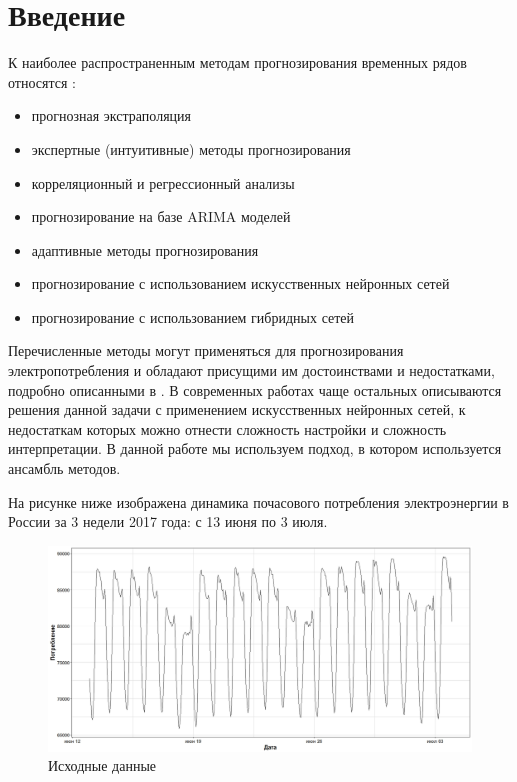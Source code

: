 \documentclass[60x84/16,8pt]{ittmm}
\begin{document}
\section{Введение}
\label{sec:intro}
К наиболее распространенным методам прогнозирования временных рядов относятся \cite{Tihonov2006}:
\begin{itemize}
    \item прогнозная экстраполяция
    \item экспертные (интуитивные) методы прогнозирования
    \item корреляционный и регрессионный анализы
    \item прогнозирование на базе ARIMA моделей
    \item адаптивные методы прогнозирования
    \item прогнозирование с использованием искусственных нейронных сетей
    \item прогнозирование с использованием гибридных сетей
\end{itemize}

Перечисленные методы могут применяться для прогнозирования электропотребления и
обладают присущими им достоинствами и недостатками, подробно описанными в
\cite{Tihonov2006}. В современных работах чаще остальных описываются решения
данной задачи с применением искусственных нейронных сетей, к недостаткам которых
можно отнести сложность настройки и сложность интерпретации. В данной работе мы
используем подход, в котором используется ансамбль методов.

На рисунке ниже изображена динамика почасового потребления электроэнергии в
России за 3 недели 2017 года: с 13 июня по 3 июля.
\begin{figure}
  \centering
  \includegraphics[width=0.8\linewidth]{Ru/train_dataset.jpeg}
  \caption{Исходные данные}
  \label{fig:data}
\end{figure}
\end{document}
